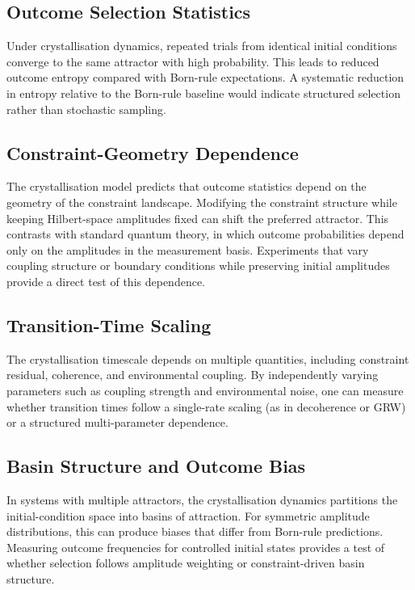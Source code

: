 \documentclass[12pt]{article}
\begin{document}
\subsection{Outcome Selection Statistics}

Under crystallisation dynamics, repeated trials from identical initial conditions converge to the same attractor with high probability. This leads to reduced outcome entropy compared with Born-rule expectations. A systematic reduction in entropy relative to the Born-rule baseline would indicate structured selection rather than stochastic sampling.

\subsection{Constraint-Geometry Dependence}

The crystallisation model predicts that outcome statistics depend on the geometry of the constraint landscape. Modifying the constraint structure while keeping Hilbert-space amplitudes fixed can shift the preferred attractor. This contrasts with standard quantum theory, in which outcome probabilities depend only on the amplitudes in the measurement basis. Experiments that vary coupling structure or boundary conditions while preserving initial amplitudes provide a direct test of this dependence.

\subsection{Transition-Time Scaling}

The crystallisation timescale depends on multiple quantities, including constraint residual, coherence, and environmental coupling. By independently varying parameters such as coupling strength and environmental noise, one can measure whether transition times follow a single-rate scaling (as in decoherence or GRW) or a structured multi-parameter dependence.

\subsection{Basin Structure and Outcome Bias}

In systems with multiple attractors, the crystallisation dynamics partitions the initial-condition space into basins of attraction. For symmetric amplitude distributions, this can produce biases that differ from Born-rule predictions. Measuring outcome frequencies for controlled initial states provides a test of whether selection follows amplitude weighting or constraint-driven basin structure.
\end{document}
